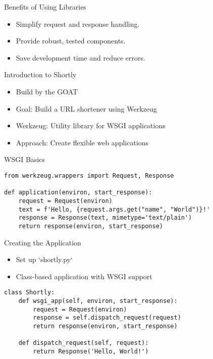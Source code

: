 \documentclass{beamer}
\begin{document}
\begin{frame}{Benefits of Using Libraries}
    \begin{itemize}
        \item Simplify request and response handling.
        \item Provide robust, tested components.
        \item Save development time and reduce errors.
    \end{itemize}
\end{frame}
\begin{frame}{Introduction to Shortly}
  \begin{itemize}
  	\item Build by the GOAT
    \item Goal: Build a URL shortener using Werkzeug
    \item Werkzeug: Utility library for WSGI applications
    \item Approach: Create flexible web applications
  \end{itemize}
\end{frame}
\begin{frame}[fragile]{WSGI Basics}
\begin{verbatim}
from werkzeug.wrappers import Request, Response

def application(environ, start_response):
    request = Request(environ)
    text = f'Hello, {request.args.get("name", "World")}!'
    response = Response(text, mimetype='text/plain')
    return response(environ, start_response)
\end{verbatim}
\end{frame}
\begin{frame}[fragile]{Creating the Application}
  \begin{itemize}
    \item Set up `shortly.py`
    \item Class-based application with WSGI support
  \end{itemize}
  \begin{verbatim}
class Shortly:
    def wsgi_app(self, environ, start_response):
        request = Request(environ)
        response = self.dispatch_request(request)
        return response(environ, start_response)
    
    def dispatch_request(self, request):
        return Response('Hello, World!')
  \end{verbatim}
\end{frame}
\end{document}
